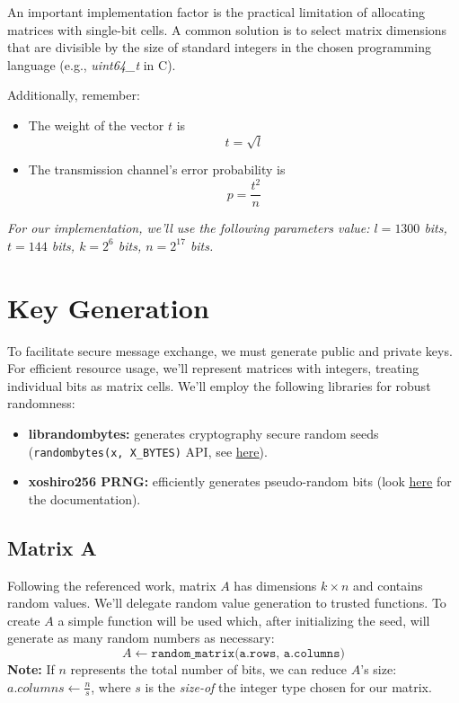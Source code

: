 An important implementation factor is the practical limitation of allocating matrices with single-bit cells. A common solution is to select matrix dimensions that are divisible by the size of standard integers in the chosen programming language (e.g., \textit{uint64\_t} in C). 

Additionally, remember:
\begin{itemize}
    \item The weight of the vector $t$ is $$t = \sqrt{l}$$
    \item The transmission channel's error probability is $$p = \frac{t^2}{n}$$
\end{itemize}

\textit{For our implementation, we'll use the following parameters value: $l = 1300$ bits, $t = 144$ bits, $k = 2^{6}$ bits, $n = 2^{17}$ bits.}

%
\section{Key Generation}

To facilitate secure message exchange, we must generate public and private keys. For efficient resource usage, we'll represent matrices with integers, treating individual bits as matrix cells. We'll employ the following libraries for robust randomness:
\begin{itemize}
    \item \textbf{librandombytes:} generates cryptography secure random seeds (\texttt{randombytes(x, X\_BYTES)} API, see \href{https://randombytes.cr.yp.to/index.html}{\underline{here}}).
    \item \textbf{xoshiro256 PRNG:} efficiently generates pseudo-random bits (look \href{https://prng.di.unimi.it}{\underline{here}} for the documentation).
\end{itemize}

\subsection{Matrix A}

Following the referenced work, matrix $A$ has dimensions $k \times n$ and contains random values. We'll delegate random value generation to trusted functions. To create $A$ a simple function will be used which, after initializing the seed, will generate as many random numbers as necessary:
$$
A \leftarrow \texttt{random\_matrix(a.rows, a.columns)}
$$ 
\textbf{Note:} If $n$ represents the total number of bits, we can reduce $A$'s size:
$a.columns \leftarrow \frac{n}{s}$, where $s$ is the \textit{size-of} the integer type chosen for our matrix.

